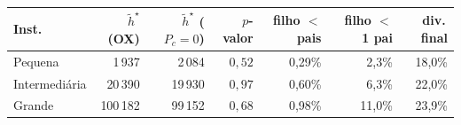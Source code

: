 \begin{tabular}{lrrrrrr}
\toprule
Inst. & $\tilde h^\star$ (OX) & $\tilde h^\star$ ($P_c{=}0$) & $p$-valor & filho $<$ pais & filho $<$ 1 pai & div.\,final \\
\midrule
Pequena & 1\,937 & 2\,084 & $0{,}52$ & 0{,}29\% & 2{,}3\% & 18{,}0\% \\
Intermediária & 20\,390 & 19\,930 & $0{,}97$ & 0{,}60\% & 6{,}3\% & 22{,}0\% \\
Grande & 100\,182 & 99\,152 & $0{,}68$ & 0{,}98\% & 11{,}0\% & 23{,}9\% \\
\bottomrule
\end{tabular}
